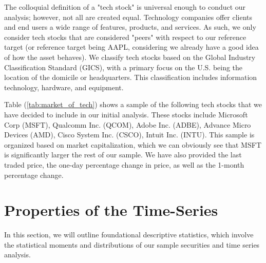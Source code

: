 \documentclass[12pt]{article}
\begin{document}
The colloquial definition of a "tech stock" is universal enough to conduct our analysis; however, not all are created equal. Technology companies offer clients and end users a wide range of features, products, and services. As such, we only consider tech stocks that are considered "peers" with respect to our reference target (or reference target being AAPL, considering we already have a good idea of how the asset behaves). We classify tech stocks based on the Global Industry Classification Standard (GICS), with a primary focus on the U.S. being the location of the domicile or headquarters. This classification includes information technology, hardware, and equipment.

Table (\ref{tab:market_of_tech}) shows a sample of the following tech stocks that we have decided to include in our initial analysis. These stocks include Microsoft Corp (MSFT), Qualcomm Inc. (QCOM), Adobe Inc. (ADBE), Advance Micro Devices (AMD), Cisco System Inc. (CSCO), Intuit Inc. (INTU). This sample is organized based on market capitalization, which we can obviously see that MSFT is significantly larger the rest of our sample. We have also provided the last traded price, the one-day percentage change in price, as well as the 1-month percentage change.

\section{Properties of the Time-Series}

In this section, we will outline foundational descriptive statistics, which involve the statistical moments and distributions of our sample securities and time series analysis.
\end{document}
